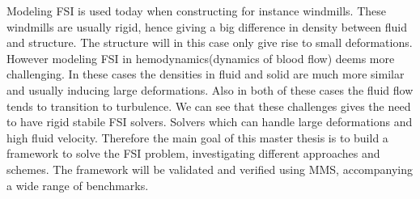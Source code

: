 Modeling FSI is used today when constructing for instance windmills. These windmills are usually rigid, hence giving a big difference in density between fluid and structure. The structure will in this case only give rise to small deformations. However modeling FSI in hemodynamics(dynamics of blood flow) deems more challenging. In these cases the densities in fluid and solid are much more similar and usually inducing large deformations. Also in both of these cases the fluid flow tends to transition to turbulence. We can see that these challenges gives the need to have rigid stabile FSI solvers. Solvers which can handle large deformations and high fluid velocity. 
Therefore the main goal of this master thesis is to build a framework to solve the FSI problem, investigating different approaches and schemes. The framework will be validated and verified using MMS, accompanying a wide range of benchmarks.  

